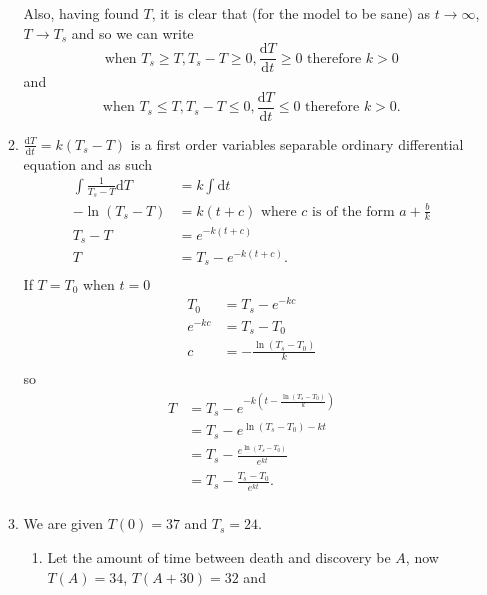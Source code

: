 \documentclass[10pt]{article}
\newcommand*{\dTdt}[0]{\frac{\text{d}T}{\text{d}t}}
\newcommand*{\dt}[0]{\text{d}t}
\newcommand*{\dT}[0]{\text{d}T}
\newcommand*{\df}[2]{\frac{\text{d}{#1}}{\text{d}{#2}}}%
\begin{document}
\begin{enumerate}
\begin{enumerate}
                Also, having found $T$, it is clear that (for the model to be
                sane) as $t \rightarrow \infty$, $T \rightarrow T_s$ and so we
                can write
                    $$\text{when } T_s \geq T, T_s - T \geq 0, \dTdt \geq 0 \text{ therefore } k > 0$$
                    and
                    $$\text{when } T_s \leq T, T_s - T \leq 0, \dTdt \leq 0 \text{ therefore } k > 0.$$
            \item $\df{T}{t} = k(T_s - T)$ is a first order variables separable
                ordinary differential equation and as such
                \begin{align*}
                    \int\frac{1}{T_s - T}\dT &= k\int \dt \\
                    -\ln(T_s - T)&= k(t + c)  \text{ where $c$ is of the form $a + \tfrac{b}{k}$}\\
                    T_s - T &=  e^{-k(t + c)}\\
                    T &= T_s - e^{-k(t+c)}. \\
                \end{align*}
            If $T = T_0$ when $t = 0$
                \begin{align*}
                    T_0 &= T_s - e^{-kc} \\
                    e^{-kc} &= T_s - T_0 \\
                    c &= -\frac{\ln(T_s - T_0)}{k} \\
                \end{align*}
                so
                \begin{align*}
                    T &= T_s - e^{-k\left(t-\tfrac{\ln(T_s - T_0)}{k}\right)} \\
                      &= T_s - e^{\ln(T_s - T_0)-kt} \\
                      &= T_s - \frac{e^{\ln(T_s - T_0)}}{e^{kt}} \\
                      &= T_s - \frac{T_s - T_0}{e^{kt}}. \\
                \end{align*}
            \item We are given $T(0) = 37$ and $T_s = 24$. 
                \begin{enumerate}
                    \item Let the amount of time between death and discovery be
                        $A$, now $T(A) = 34$, $T(A + 30) = 32$ and
                    \begin{align*}

\end{align*}
\end{enumerate}
\end{enumerate}
\end{enumerate}
\end{document}

